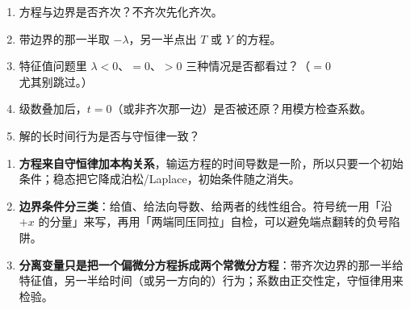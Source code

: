 
\begin{enumerate}[label=(\arabic*)]
  \item 方程与边界是否齐次？不齐次先化齐次。
  \item 带边界的那一半取 $-\lambda$，另一半点出 $T$ 或 $Y$ 的方程。
  \item 特征值问题里 $\lambda<0$、$=0$、$>0$ 三种情况是否都看过？（$=0$ 尤其别跳过。）
  \item 级数叠加后，$t=0$（或非齐次那一边）是否被还原？用模方检查系数。
  \item 解的长时间行为是否与守恒律一致？
\end{enumerate}


\label{sec:76}


\begin{enumerate}[label=\textbf{(\arabic*)}]
  \item \textbf{方程来自守恒律加本构关系}，输运方程的时间导数是一阶，所以只要一个初始条件；稳态把它降成泊松/Laplace，初始条件随之消失。
  \item \textbf{边界条件分三类}：给值、给法向导数、给两者的线性组合。符号统一用「沿 $+x$ 的分量」来写，再用「两端同压同拉」自检，可以避免端点翻转的负号陷阱。
  \item \textbf{分离变量只是把一个偏微分方程拆成两个常微分方程}：带齐次边界的那一半给特征值，另一半给时间（或另一方向的）行为；系数由正交性定，守恒律用来检验。
\end{enumerate}


